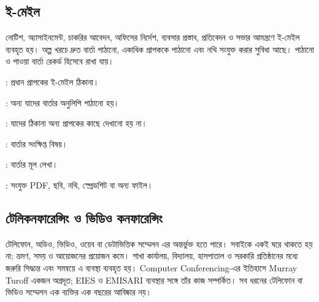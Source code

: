 \begin{topicbody}
\subsection{ই-মেইল}
নোটিশ, অ্যাসাইনমেন্ট, চাকরির আবেদন, অফিসের নির্দেশ, ব্যবসার প্রস্তাব, প্রতিবেদন ও সভার আমন্ত্রণে ই-মেইল ব্যবহৃত হয়। অল্প খরচে দ্রুত বার্তা পাঠানো, একাধিক প্রাপককে পাঠানো এবং নথি সংযুক্ত করার সুবিধা আছে। পাঠানো ও পাওয়া বার্তা রেকর্ড হিসেবে রাখা যায়।
\begin{compactpoints}
\item {}: প্রধান প্রাপকের ই-মেইল ঠিকানা।
\item {}: অন্য যাদের বার্তার অনুলিপি পাঠানো হয়।
\item {}: যাদের ঠিকানা অন্য প্রাপকের কাছে দেখানো হয় না।
\item {}: বার্তার সংক্ষিপ্ত বিষয়।
\item {}: বার্তার মূল লেখা।
\item {}: সংযুক্ত PDF, ছবি, নথি, স্প্রেডশিট বা অন্য ফাইল।
\end{compactpoints}

\subsection{টেলিকনফারেন্সিং ও ভিডিও কনফারেন্সিং}
টেলিফোন, অডিও, ভিডিও, ওয়েব বা ডেটাভিত্তিক সম্মেলন এর অন্তর্ভুক্ত হতে পারে। সবাইকে একই ঘরে থাকতে হয় না; ভ্রমণ, সময় ও আয়োজনের প্রয়োজন কমে। শাখা কার্যালয়, বিদ্যালয়, হাসপাতাল ও সরকারি প্রতিষ্ঠানের মধ্যে জরুরি সিদ্ধান্ত এবং সমন্বয়ে এ ব্যবস্থা ব্যবহৃত হয়। Computer Conferencing-এর ইতিহাসে Murray Turoff একজন অগ্রদূত; EIES ও EMISARI ব্যবস্থার সঙ্গে তাঁর কাজ সম্পর্কিত। সব ধরনের টেলিফোন বা ভিডিও সম্মেলন এক ব্যক্তির এক বছরের আবিষ্কার নয়।


\end{topicbody}
